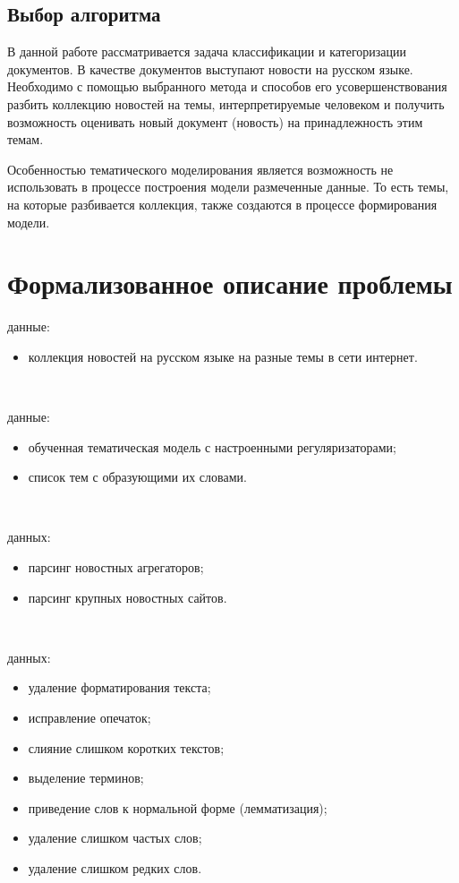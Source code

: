 \subsection{Выбор алгоритма}

В данной работе рассматривается задача \todo{}классификации и категоризации документов. В качестве документов выступают новости на русском языке. Необходимо с помощью выбранного метода и способов его усовершенствования разбить коллекцию новостей на темы, интерпретируемые человеком и получить возможность оценивать новый документ (новость) на принадлежность этим темам.

Особенностью тематического моделирования является возможность не использовать в процессе построения модели размеченные данные. То есть темы, на которые разбивается коллекция, также создаются в процессе формирования модели. 

\section{Формализованное описание проблемы}

 данные:

\begin{itemize}
    \item коллекция новостей на русском языке на разные темы в сети интернет.
\end{itemize}

~\

 данные:

\begin{itemize}
    \item обученная тематическая модель с настроенными регуляризаторами;
    \item список тем с образующими их словами.
\end{itemize}

~\

 данных:

\begin{itemize}
    \item парсинг новостных агрегаторов;
    \item парсинг крупных новостных сайтов.
\end{itemize}

~\

 данных:

\begin{itemize}
    \item удаление форматирования текста;
    \item исправление опечаток;
    \item слияние слишком коротких текстов;
    \item выделение терминов;
    \item приведение слов к нормальной форме (лемматизация);
    \item удаление слишком частых слов;
    \item удаление слишком редких слов.
\end{itemize}

